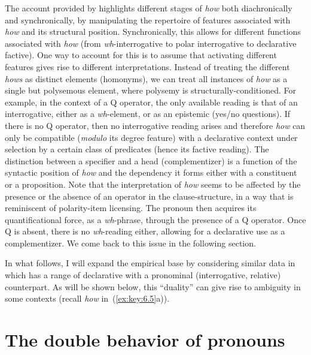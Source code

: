 \documentclass[output=paper]{langsci/langscibook}
\begin{document}
The account provided by \citet{vanGelderen2015} highlights different stages of
\emph{how} both diachronically and synchronically, by manipulating the
repertoire of features associated with \emph{how} and its structural position.
Synchronically, this allows for different functions associated with \emph{how}
(from \emph{wh}-interrogative to polar interrogative to declarative factive). One way
to account for this is to assume that activating different features gives rise
to different interpretations. Instead of treating the different \emph{hows} as
distinct elements (homonyms), we can treat all instances of \emph{how} as a
single but polysemous element, where polysemy is structurally-conditioned. For
example, in the context of a Q operator, the only available reading is that of
an interrogative, either as a \emph{wh}-element, or as an epistemic (yes/no
questions). If there is no Q operator, then no interrogative reading arises and
therefore \emph{how} can only be compatible (\emph{modulo} its degree feature)
with a declarative context under selection by a certain class of predicates
(hence its factive reading). The distinction between a specifier and a head
(complementizer) is a function of the syntactic position of \emph{how} and the
dependency it forms either with a constituent or a proposition. Note that the
interpretation of \emph{how} seems to be affected by the presence or the
absence of an operator in the clause-structure, in a way that is reminiscent of
polarity-item licensing. The pronoun then acquires its quantificational force,
as a \emph{wh}-phrase, through the presence of a Q operator. Once Q is absent, there
is no \emph{wh}-reading either, allowing for a declarative use as a complementizer. We
come back to this issue in the following section.

In what follows, I will expand the empirical base by considering similar data
in  which has a range of declarative  with a
pronominal (interrogative, relative) counterpart. As will be shown below, this
\enquote{duality} can give rise to ambiguity in some contexts (recall
\emph{how} in~(\ref{ex:key:6.5}a)).

\section{The double behavior of pronouns}\label{sec:double-pron}
\end{document}
